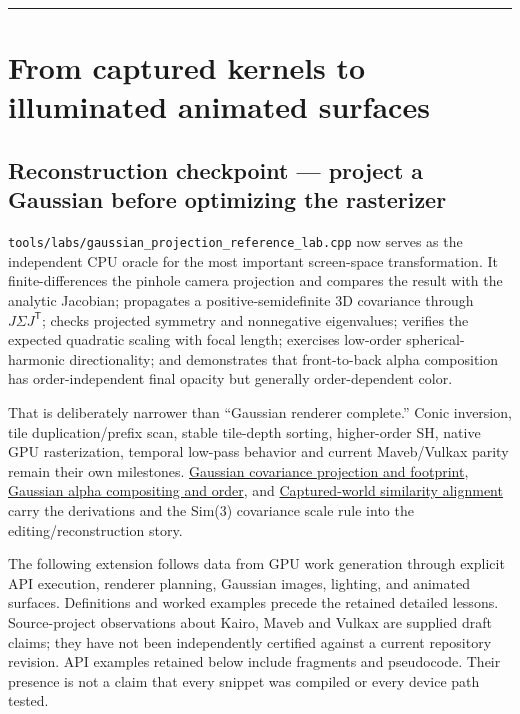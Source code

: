 \begin{center}\rule{0.5\linewidth}{0.5pt}\end{center}

\section{From captured kernels to illuminated animated surfaces}\label{04-visual-computing-ii-ch036-from-captured-kernels-to-illuminated-animated-surfaces}

\subsection{Reconstruction checkpoint --- project a Gaussian before optimizing the rasterizer}\label{04-visual-computing-ii-ch036-reconstruction-checkpoint-project-a-gaussian-before-optimizing-the-rasterizer}

\texttt{tools/labs/gaussian\_projection\_reference\_lab.cpp} now serves as the independent CPU oracle for the most important screen-space transformation. It finite-differences the pinhole camera projection and compares the result with the analytic Jacobian; propagates a positive-semidefinite 3D covariance through \(J\Sigma J^{\mathsf T}\); checks projected symmetry and nonnegative eigenvalues; verifies the expected quadratic scaling with focal length; exercises low-order spherical-harmonic directionality; and demonstrates that front-to-back alpha composition has order-independent final opacity but generally order-dependent color.

That is deliberately narrower than ``Gaussian renderer complete.'' Conic inversion, tile duplication/prefix scan, stable tile-depth sorting, higher-order SH, native GPU rasterization, temporal low-pass behavior and current Maveb/Vulkax parity remain their own milestones. \hyperref[appendix-24269cb6977c]{Gaussian covariance projection and footprint}, \hyperref[appendix-5f4b2e24c3f6]{Gaussian alpha compositing and order}, and \hyperref[appendix-5f40b4fea463]{Captured-world similarity alignment} carry the derivations and the Sim(3) covariance scale rule into the editing/reconstruction story.

The following extension follows data from GPU work generation through explicit API execution, renderer planning, Gaussian images, lighting, and animated surfaces. Definitions and worked examples precede the retained detailed lessons. Source-project observations about Kairo, Maveb and Vulkax are supplied draft claims; they have not been independently certified against a current repository revision. API examples retained below include fragments and pseudocode. Their presence is not a claim that every snippet was compiled or every device path tested.

